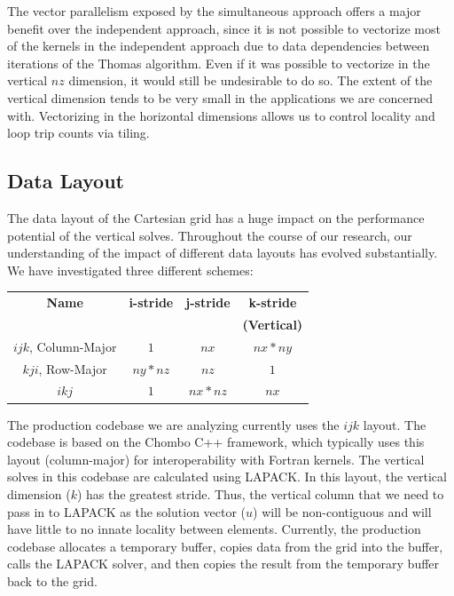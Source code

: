 \documentclass[conference]{IEEEtran}
\begin{document}

The vector parallelism exposed by the simultaneous approach offers a major
benefit over the independent approach, since it is not possible to vectorize
most of the kernels in the independent approach due to data dependencies
between iterations of the Thomas algorithm. Even if it was possible to
vectorize in the vertical $nz$ dimension, it would still be undesirable to do
so. The extent of the vertical dimension tends to be very small in the
applications we are concerned with. Vectorizing in the
horizontal dimensions allows us to control locality and loop trip counts via
tiling.

\subsection{Data Layout}

The data layout of the Cartesian grid has a huge impact on the performance
potential of the vertical solves. Throughout the course of our research, our
understanding of the impact of different data layouts has evolved
substantially. We have investigated three different schemes:

\begin{tabular}[t]{c|c|c|c} \hline
\textbf{Name}         & \textbf{i-stride} & \textbf{j-stride} & \textbf{k-stride}   \\
                      &                   &                   & \textbf{(Vertical)} \\ \hline
\(ijk\), Column-Major & \(1\)             & \(nx\)            & \(nx * ny\)         \\ 
\(kji\), Row-Major    & \(ny * nz\)       & \(nz\)            & \(1\)               \\ 
\(ikj\)               & \(1\)             & \(nx * nz\)       & \(nx\)              
\end{tabular}

The production codebase we are analyzing currently uses the \(ijk\) layout. The
codebase is based on the Chombo C++ framework, which typically uses this layout
(column-major) for interoperability with Fortran kernels. The vertical solves
in this codebase are calculated using LAPACK. In this layout, the vertical
dimension (\(k\)) has the greatest stride. Thus, the vertical column that we
need to pass in to LAPACK as the solution vector (\(u\)) will be non-contiguous
and will have little to no innate locality between elements. Currently, the
production codebase allocates a temporary buffer, copies data from the grid
into the buffer, calls the LAPACK solver, and then copies the result from the
temporary buffer back to the grid.
\end{document}
